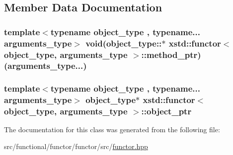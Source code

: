 \subsection{Member Data Documentation}
\hypertarget{classxstd_1_1functor_a673d0ccf7da14d0d7f4726bbdf8af8a4}{
\subsubsection[{method\-\_\-ptr}]{\setlength{\rightskip}{0pt plus 5cm}template$<$typename object\-\_\-type , typename... arguments\-\_\-type$>$ void(object\-\_\-type\-::$\ast$ {\bf xstd\-::functor}$<$ object\-\_\-type, arguments\-\_\-type $>$\-::method\-\_\-ptr)(arguments\-\_\-type...)}}\label{classxstd_1_1functor_a673d0ccf7da14d0d7f4726bbdf8af8a4}
\hypertarget{classxstd_1_1functor_a919d42ea50702cf2ff02360f175b02ad}{
\subsubsection[{object\-\_\-ptr}]{\setlength{\rightskip}{0pt plus 5cm}template$<$typename object\-\_\-type , typename... arguments\-\_\-type$>$ object\-\_\-type$\ast$ {\bf xstd\-::functor}$<$ object\-\_\-type, arguments\-\_\-type $>$\-::object\-\_\-ptr}}\label{classxstd_1_1functor_a919d42ea50702cf2ff02360f175b02ad}


The documentation for this class was generated from the following file\-:\begin{DoxyCompactItemize}
\item 
src/functional/functor/functor/src/\hyperlink{functor_8hpp}{functor.\-hpp}\end{DoxyCompactItemize}
